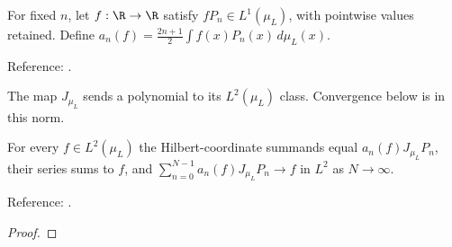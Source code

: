 \begin{definition}
\label{def:legendre-coefficients}
\leanok
For fixed $n$, let $f:\R\to\R$ satisfy $fP_n\in L^1(\mu_L)$, with pointwise values retained. Define $a_n(f)=\frac{2n+1}{2}\int f(x)P_n(x)\,d\mu_L(x)$.

Reference: \cite[18.2(viii)]{dlmf}.
\end{definition}

The map $J_{\mu_L}$ sends a polynomial to its $L^2(\mu_L)$ class. Convergence below is in this norm.

\begin{theorem}
\label{thm:legendre-L2-expansion}
\leanok
For every $f\in L^2(\mu_L)$ the Hilbert-coordinate summands equal $a_n(f)J_{\mu_L}P_n$, their series sums to $f$, and $\sum_{n=0}^{N-1}a_n(f)J_{\mu_L}P_n\to f$ in $L^2$ as $N\to\infty$.

Reference: \cite[18.2(viii)]{dlmf}.
\end{theorem}
\begin{proof}
\leanok
\end{proof}

